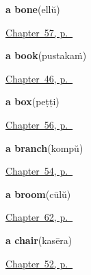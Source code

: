 \noindent\begin{minipage}[t]{\linewidth}
\raggedright
\textbf{a bone}\enspace\emph{}\enspace(ellŭ)\par
\footnotesize \hyperref[ch:ml-five-more-of-the-body]{Chapter~57, p.~\pageref*{ch:ml-five-more-of-the-body}}
\end{minipage}\par\smallskip

\noindent\begin{minipage}[t]{\linewidth}
\raggedright
\textbf{a book}\enspace\emph{}\enspace(pustakaṁ)\par
\footnotesize \hyperref[ch:ml-ask-for]{Chapter~46, p.~\pageref*{ch:ml-ask-for}}
\end{minipage}\par\smallskip

\noindent\begin{minipage}[t]{\linewidth}
\raggedright
\textbf{a box}\enspace\emph{}\enspace(peṭṭi)\par
\footnotesize \hyperref[ch:ml-things-about-the-house]{Chapter~56, p.~\pageref*{ch:ml-things-about-the-house}}
\end{minipage}\par\smallskip

\noindent\begin{minipage}[t]{\linewidth}
\raggedright
\textbf{a branch}\enspace\emph{}\enspace(kompŭ)\par
\footnotesize \hyperref[ch:ml-a-tree-part-by-part]{Chapter~54, p.~\pageref*{ch:ml-a-tree-part-by-part}}
\end{minipage}\par\smallskip

\noindent\begin{minipage}[t]{\linewidth}
\raggedright
\textbf{a broom}\enspace\emph{}\enspace(cūlŭ)\par
\footnotesize \hyperref[ch:ml-made-by-hand]{Chapter~62, p.~\pageref*{ch:ml-made-by-hand}}
\end{minipage}\par\smallskip

\noindent\begin{minipage}[t]{\linewidth}
\raggedright
\textbf{a chair}\enspace\emph{}\enspace(kasēra)\par
\footnotesize \hyperref[ch:ml-welcoming-a-guest]{Chapter~52, p.~\pageref*{ch:ml-welcoming-a-guest}}
\end{minipage}\par\smallskip

